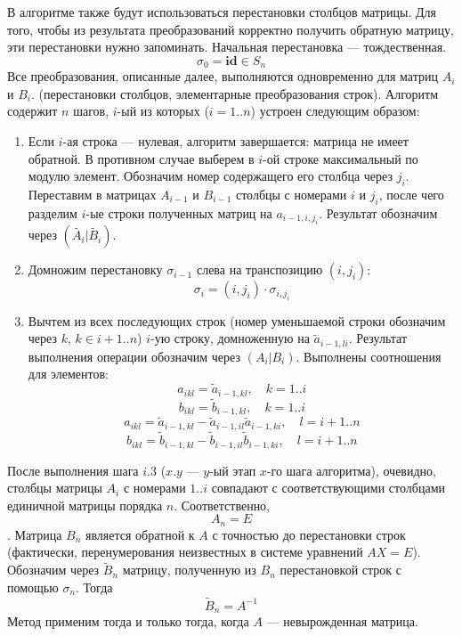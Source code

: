 \documentclass[12pt, russian]{article}
\begin{document}
В алгоритме также будут использоваться перестановки столбцов матрицы. Для того, чтобы из результата преобразований корректно получить обратную матрицу, эти перестановки нужно запоминать. Начальная перестановка --- тождественная.
$$ \sigma_0 = \textbf{id} \in S_n $$
Все преобразования, описанные далее, выполняются одновременно для матриц $A_i$ и $B_i$. (перестановки столбцов, элементарные преобразования строк).
Алгоритм содержит $n$ шагов, $i$-ый из которых ($i=1..n$) устроен следующим образом:
\begin{enumerate}

\item Если $i$-ая строка --- нулевая, алгоритм завершается: матрица не имеет обратной. В противном случае выберем в $i$-ой строке максимальный по модулю элемент. Обозначим номер содержащего его столбца через $j_i$. Переставим в матрицах $A_{i-1}$ и $B_{i-1}$ столбцы с номерами $i$ и $j_i$, после чего разделим $i$-ые строки полученных матриц на $a_{i-1,i,j_i}$. Результат обозначим через $(\tilde{A_i}|\tilde{B_i})$.

\item Домножим перестановку $\sigma_{i-1}$ слева на транспозицию $(i,j_i)$:
$$ \sigma_i = (i,j_i) \cdot \sigma_{i,j_i} $$

\item Вычтем из всех последующих строк (номер уменьшаемой строки обозначим через $k,\,k\in i+1..n$) $i$-ую строку, домноженную на $\tilde{a}_{i-1,li}$. Результат выполнения операции обозначим через $(A_i|B_i)$. Выполнены соотношения для элементов:
\pagebreak
$$ a_{ikl} = \tilde{a}_{i-1,kl},\quad k=1..i $$
$$ b_{ikl} = \tilde{b}_{i-1,kl},\quad k=1..i $$
$$ a_{ikl} = \tilde{a}_{i-1,kl} - \tilde{a}_{i-1,il}\tilde{a}_{i-1,ki},\quad l=i+1..n $$
$$ b_{ikl} = \tilde{b}_{i-1,kl} - \tilde{b}_{i-1,il}\tilde{b}_{i-1,ki},\quad l=i+1..n $$

\end{enumerate}

После выполнения шага $i.3$ ($x.y$ --- $y$-ый этап $x$-го шага алгоритма), очевидно, столбцы матрицы $A_i$ с номерами $1..i$ совпадают с соответствующими столбцами единичной матрицы порядка $n$. Соответственно, $$A_n = E$$. Матрица $B_n$ является обратной к $A$ с точностью до перестановки строк (фактически, перенумерования неизвестных в системе уравнений $AX=E$). Обозначим через $\tilde{B}_n$ матрицу, полученную из $B_n$ перестановкой строк с помощью $\sigma_n$. Тогда
$$ \tilde{B}_n = A^{-1} $$
Метод применим тогда и только тогда, когда $A$ --- невырожденная матрица.
\end{document}
